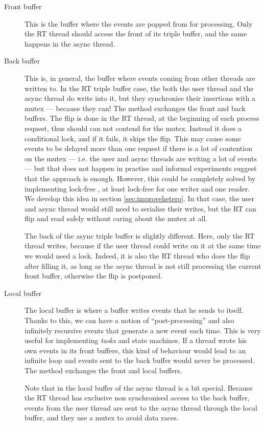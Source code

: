 \begin{description}
\item[Front buffer] This is the
  buffer where the events are popped from for processing. Only the RT
  thread should access the front of its triple buffer, and the same
  happens in the async thread.

\item[Back buffer] This is, in general, the buffer where events coming
  from other threads are written to. In the RT triple buffer case, the
  both the user thread and the async thread do write into it, but they
  synchronise their insertions with a mutex --- because they can! The
   method exchanges the front and back
  buffers. The flip is done in the RT thread, at the beginning of each
  process request, thus should can not contend for the mutex. Instead
  it does a conditional lock, and if it fails, it skips the flip. This
  may cause some events to be delayed more than one request if there
  is a lot of contention on the mutex --- i.e. the user and async
  threads are writing a lot of events --- but that does not happen in
  practise and informal experiments suggest that the approach is
  enough. However, this could be completely solved by implementing
  lock-free , at least lock-free for one writer
  and one reader. We develop this idea in section
  \ref{sec:improvehetero}. In that case, the user and async thread
  would still need to serialise their writes, but the RT can flip and
  read safely without caring about the mutex at all.

  The back of the async triple buffer is slightly different. Here,
  only the RT thread writes, because if the user thread could write on
  it at the same time we would need a lock. Indeed, it is also the RT
  thread who does the flip after filling it, as long as the async
  thread is not still processing the current front buffer, otherwise
  the flip is postponed.

\item[Local buffer] The local buffer is where a buffer writes events
  that he sends to itself. Thanks to this, we can have a notion of
  ``post-processing'' and also infinitely recursive events that
  generate a new event each time. This is very useful for implementing
  \emph{tasks} and state machines. If a thread wrote his own events in
  its front buffers, this kind of behaviour would lead to an infinite
  loop and events sent to the back buffer would never be
  processed. The  method exchanges the front and
  local buffers.

  Note that in the local buffer of the async thread is a bit
  special. Because the RT thread has exclusive non synchronised access
  to the back buffer, events from the user thread are sent to the
  async thread through the local buffer, and they use a mutex to avoid
  data races.
\end{description}

